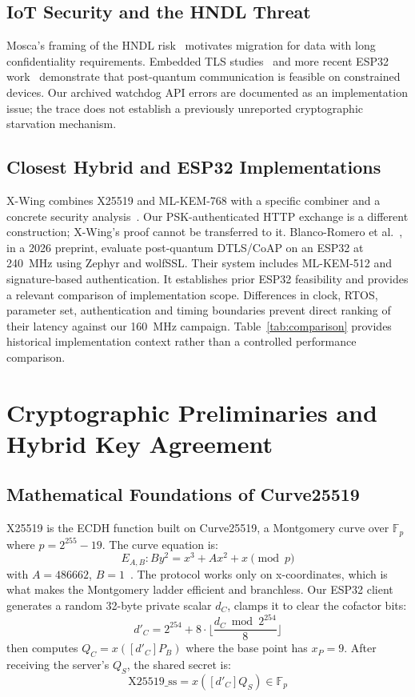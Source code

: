 \documentclass[journal, 10pt]{IEEEtran}
\begin{document}
\subsection{IoT Security and the HNDL Threat}
Mosca's framing of the HNDL risk~\cite{b10} motivates migration for data with long confidentiality requirements. Embedded TLS studies~\cite{b11} and more recent ESP32 work~\cite{b42} demonstrate that post-quantum communication is feasible on constrained devices. Our archived watchdog API errors are documented as an implementation issue; the trace does not establish a previously unreported cryptographic starvation mechanism.

\subsection{Closest Hybrid and ESP32 Implementations}
X-Wing combines X25519 and ML-KEM-768 with a specific combiner and a concrete security analysis~\cite{b41}. Our PSK-authenticated HTTP exchange is a different construction; X-Wing's proof cannot be transferred to it. Blanco-Romero et al.~\cite{b42}, in a 2026 preprint, evaluate post-quantum DTLS/CoAP on an ESP32 at 240~MHz using Zephyr and wolfSSL. Their system includes ML-KEM-512 and signature-based authentication. It establishes prior ESP32 feasibility and provides a relevant comparison of implementation scope. Differences in clock, RTOS, parameter set, authentication and timing boundaries prevent direct ranking of their latency against our 160~MHz campaign. Table~\ref{tab:comparison} provides historical implementation context rather than a controlled performance comparison.

\section{Cryptographic Preliminaries and Hybrid Key Agreement}
\subsection{Mathematical Foundations of Curve25519}
X25519 is the ECDH function built on Curve25519, a Montgomery curve over $\mathbb{F}_p$ where $p = 2^{255} - 19$. The curve equation is:
\begin{equation}
E_{A,B} : By^2 = x^3 + Ax^2 + x \pmod{p}
\end{equation}
with $A = 486662$, $B = 1$~\cite{b5}. The protocol works only on x-coordinates, which is what makes the Montgomery ladder efficient and branchless. Our ESP32 client generates a random 32-byte private scalar $d_C$, clamps it to clear the cofactor bits:
\begin{equation}
d'_C = 2^{254} + 8 \cdot \lfloor \frac{d_C \bmod 2^{254}}{8} \rfloor
\end{equation}
then computes $Q_C = x([d'_C]P_B)$ where the base point has $x_P = 9$. After receiving the server's $Q_S$, the shared secret is:
\begin{equation}
\text{X25519\_ss} = x([d'_C]Q_S) \in \mathbb{F}_p
\end{equation}
\end{document}
